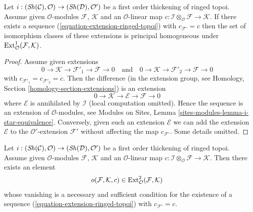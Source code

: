 \begin{lemma}
\label{lemma-inf-ext-ringed-topoi}
Let $i : (\mathop{\mathit{Sh}}\nolimits(\mathcal{C}), \mathcal{O}) \to (\mathop{\mathit{Sh}}\nolimits(\mathcal{D}), \mathcal{O}')$
be a first order thickening of ringed topoi. Assume given
$\mathcal{O}$-modules $\mathcal{F}$, $\mathcal{K}$
and an $\mathcal{O}$-linear map
$c : \mathcal{I} \otimes_\mathcal{O} \mathcal{F} \to \mathcal{K}$.
If there exists a sequence (\ref{equation-extension-ringed-topoi}) with
$c_{\mathcal{F}'} = c$ then the set of isomorphism classes of these
extensions is principal homogeneous under
$\mathop{\mathrm{Ext}}\nolimits^1_\mathcal{O}(\mathcal{F}, \mathcal{K})$.
\end{lemma}

\begin{proof}
Assume given extensions
$$
0 \to \mathcal{K} \to \mathcal{F}'_1 \to \mathcal{F} \to 0
\quad\text{and}\quad
0 \to \mathcal{K} \to \mathcal{F}'_2 \to \mathcal{F} \to 0
$$
with $c_{\mathcal{F}'_1} = c_{\mathcal{F}'_2} = c$. Then the difference
(in the extension group, see
Homology, Section \ref{homology-section-extensions})
is an extension
$$
0 \to \mathcal{K} \to \mathcal{E} \to \mathcal{F} \to 0
$$
where $\mathcal{E}$ is annihilated by $\mathcal{I}$ (local computation
omitted). Hence the sequence is an extension of $\mathcal{O}$-modules,
see Modules on Sites, Lemma \ref{sites-modules-lemma-i-star-equivalence}.
Conversely, given such an extension $\mathcal{E}$ we can add the extension
$\mathcal{E}$ to the $\mathcal{O}'$-extension $\mathcal{F}'$ without
affecting the map $c_{\mathcal{F}'}$. Some details omitted.
\end{proof}

\begin{lemma}
\label{lemma-inf-obs-ext-ringed-topoi}
Let $i : (\mathop{\mathit{Sh}}\nolimits(\mathcal{C}), \mathcal{O}) \to (\mathop{\mathit{Sh}}\nolimits(\mathcal{D}), \mathcal{O}')$
be a first order thickening of ringed topoi. Assume given
$\mathcal{O}$-modules $\mathcal{F}$, $\mathcal{K}$
and an $\mathcal{O}$-linear map
$c : \mathcal{I} \otimes_\mathcal{O} \mathcal{F} \to \mathcal{K}$.
Then there exists an element
$$
o(\mathcal{F}, \mathcal{K}, c) \in
\mathop{\mathrm{Ext}}\nolimits^2_\mathcal{O}(\mathcal{F}, \mathcal{K})
$$
whose vanishing is a necessary and sufficient condition for the existence
of a sequence (\ref{equation-extension-ringed-topoi})
with $c_{\mathcal{F}'} = c$.
\end{lemma}

